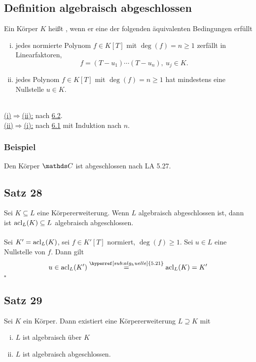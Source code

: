 \subsection{Definition algebraisch abgeschlossen}
\label{sub:def_alg_abgeschlossen}
Ein Körper $K$ heißt , wenn er eine der folgenden äquivalenten Bedingungen erfüllt
\begin{enumerate}[(i)]
	\item jedes normierte Polynom $f\in K[T]$ mit $\deg(f)=n\ge1$ zerfällt in Linearfaktoren,
	\[
	f=(T-u_1)\cdots(T-u_n),~u_j\in K.
	\]
	\item jedes Polynom $f\in K[T]$ mit $\deg(f)=n\ge 1$ hat mindestens eine Nullstelle $u\in K$.
\end{enumerate}

\\
\uline{(i)$\Rightarrow$(ii):} nach \hyperref[sub:def_normiert]{6.2}.\\
\uline{(ii)$\Rightarrow$(i):} nach \hyperref[sub:lemma_15]{6.1} mit Induktion nach $n$.

\subsubsection*{Beispiel}
Den Körper $\C$ ist abgeschlossen nach LA 5.27.

\subsection{Satz 28}
\label{sub:satz_28}
Sei $K\subseteq L$ eine Körpererweiterung.
Wenn $L$ algebraisch abgeschlossen ist, dann ist $\operatorname{acl}_L(K)\subseteq L$ algebraisch abgeschlossen.\\

\\
Sei $K'=\operatorname{acl}_L(K)$, sei $f\in K'[T]$ normiert, $\deg(f)\ge1$.
Sei $u\in L$ eine Nullstelle von $f$.
Dann gilt
\[
u\in \acl_L(K')\bgl{\hyperref[sub:alg_huelle]{5.21}}\acl_L(K)=K'
\]
\hfill $\square$

\subsection{Satz 29}
\label{sub:satz_29}
Sei $K$ ein Körper.
Dann existiert eine Körpererweiterung $L\supseteq K$ mit
\begin{enumerate}[(i)]
	\item $L$ ist algebraisch über $K$
	\item $L$ ist algebraisch abgeschlossen.
\end{enumerate}

